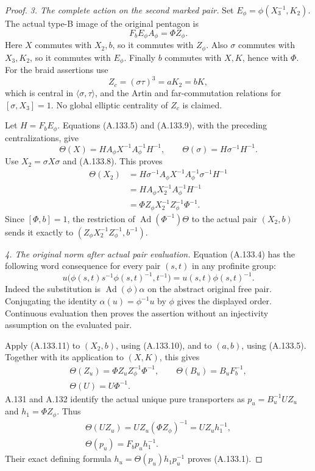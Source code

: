 \begin{proof}
\par\smallskip\noindent\emph{3. The complete action on the second marked pair.}
Set \(E_\phi=\phi(X_3^{-1},K_2)\). The actual type-B image
of the original pentagon is
\[
                  F_bE_\phi A_\phi=\Phi Z_\phi.
 \tag{A.133.9}
\]
Here \(X\) commutes with \(X_2,b\), so it commutes with
\(Z_\phi\). Also \(\sigma\) commutes with \(X_3,K_2\),
so it commutes with \(E_\phi\). Finally \(b\) commutes with
\(X,K\), hence with \(\Phi\). For the braid assertions use
\[
 Z_c=(\sigma\tau)^3=aK_2=bK,
\]
which is central in \(\langle\sigma,\tau\rangle\), and the
Artin and far-commutation relations for \([\sigma,X_3]=1\).
No global elliptic centrality of \(Z_c\) is claimed.

Let \(H=F_bE_\phi\). Equations (A.133.5) and (A.133.9),
with the preceding centralizations, give
\[
 \Theta(X)=HA_\phi X^{-1}A_\phi^{-1}H^{-1},\qquad
 \Theta(\sigma)=H\sigma^{-1}H^{-1}.
\]
Use \(X_2=\sigma X\sigma\) and (A.133.8). This proves
\[
\begin{aligned}
 \Theta(X_2)
 &=H\sigma^{-1}A_\phi X^{-1}A_\phi^{-1}\sigma^{-1}H^{-1}\\
 &=HA_\phi X_2^{-1}A_\phi^{-1}H^{-1}\\
 &=\Phi Z_\phi X_2^{-1}Z_\phi^{-1}\Phi^{-1}.
\end{aligned}                                           \tag{A.133.10}
\]
Since \([\Phi,b]=1\), the restriction of
\(\operatorname{Ad}(\Phi^{-1})\Theta\) to the actual pair
\((X_2,b)\) sends it exactly to
\((Z_\phi X_2^{-1}Z_\phi^{-1},b^{-1})\).

\par\smallskip\noindent\emph{4. The original norm after actual pair evaluation.}
Equation (A.133.4) has the following word consequence for every
pair \((s,t)\) in any profinite group:
\[
 u\bigl(\phi(s,t)s^{-1}\phi(s,t)^{-1},t^{-1}\bigr)
       =u(s,t)\phi(s,t)^{-1}.
 \tag{A.133.11}
\]
Indeed the substitution is \(\operatorname{Ad}(\phi)\alpha\)
on the abstract original free pair. Conjugating the identity
\(\alpha(u)=\phi^{-1}u\) by \(\phi\) gives the displayed order.
Continuous evaluation then proves the assertion without an
injectivity assumption on the evaluated pair.

Apply (A.133.11) to \((X_2,b)\), using (A.133.10), and to
\((a,b)\), using (A.133.5). Together with its application to
\((X,K)\), this gives
\[
\begin{gathered}
 \Theta(Z_u)=\Phi Z_uZ_\phi^{-1}\Phi^{-1},\qquad
 \Theta(B_u)=B_uF_b^{-1},\\
 \Theta(U)=U\Phi^{-1}.
\end{gathered}                                           \tag{A.133.12}
\]
A.131 and A.132 identify the actual unique pure transporters as
\(p_u=B_u^{-1}UZ_u\) and \(h_1=\Phi Z_\phi\). Thus
\[
\begin{gathered}
 \Theta(UZ_u)=UZ_u(\Phi Z_\phi)^{-1}=UZ_uh_1^{-1},\\
 \Theta(p_u)=F_bp_uh_1^{-1}.
\end{gathered}
 \tag{A.133.13}
\]
Their exact defining formula
\(h_u=\Theta(p_u)h_1p_u^{-1}\) proves (A.133.1).


\end{proof}
